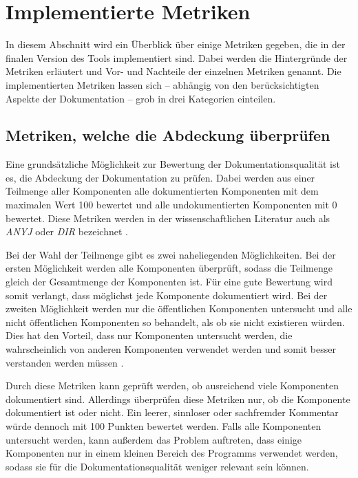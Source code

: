 \section{Implementierte Metriken}\label{chapter:metrics}
In diesem Abschnitt wird ein Überblick über einige Metriken gegeben, die in der finalen Version des Tools implementiert sind. Dabei werden die Hintergründe der Metriken erläutert und Vor- und Nachteile der einzelnen Metriken genannt. Die implementierten Metriken lassen sich -- abhängig von den berücksichtigten Aspekte der Dokumentation -- grob in drei Kategorien einteilen.

\subsection{Metriken, welche die Abdeckung überprüfen}\label{chapter:metrics_coverage}
Eine grundsätzliche Möglichkeit zur Bewertung der Dokumentationsqualität ist es, die Abdeckung der Dokumentation zu prüfen. Dabei werden aus einer  Teilmenge aller Komponenten alle dokumentierten Komponenten mit dem maximalen Wert 100 bewertet und alle undokumentierten Komponenten mit 0 bewertet.  Diese Metriken werden in der wissenschaftlichen Literatur auch als \textit{ANYJ} oder \textit{DIR} bezeichnet \cite[S.~5]{HowDocumentationEvolvesoverTime}.

Bei der Wahl der Teilmenge gibt es zwei naheliegenden Möglichkeiten. Bei der ersten Möglichkeit werden alle Komponenten überprüft, sodass die Teilmenge gleich der Gesamtmenge der Komponenten ist. Für eine gute Bewertung wird somit verlangt, dass möglichst jede Komponente dokumentiert wird. Bei der zweiten Möglichkeit werden nur die öffentlichen Komponenten untersucht und alle nicht öffentlichen Komponenten so behandelt, als ob sie nicht existieren würden. Dies hat den Vorteil, dass nur Komponenten untersucht werden, die wahrscheinlich von anderen Komponenten verwendet werden und somit besser verstanden werden müssen \cite[S.~253]{JavadocViolationsandTheirEvolutioninOpen-SourceSoftware}. 


Durch diese Metriken kann geprüft werden, ob ausreichend viele Komponenten dokumentiert sind. Allerdings überprüfen diese Metriken nur, ob die Komponente dokumentiert ist oder nicht. Ein leerer, sinnloser oder sachfremder Kommentar würde dennoch mit 100 Punkten bewertet werden. Falls alle Komponenten untersucht werden, kann außerdem das Problem auftreten, dass einige Komponenten nur in einem kleinen Bereich des Programms verwendet werden, sodass sie für die Dokumentationsqualität weniger relevant sein können. 

